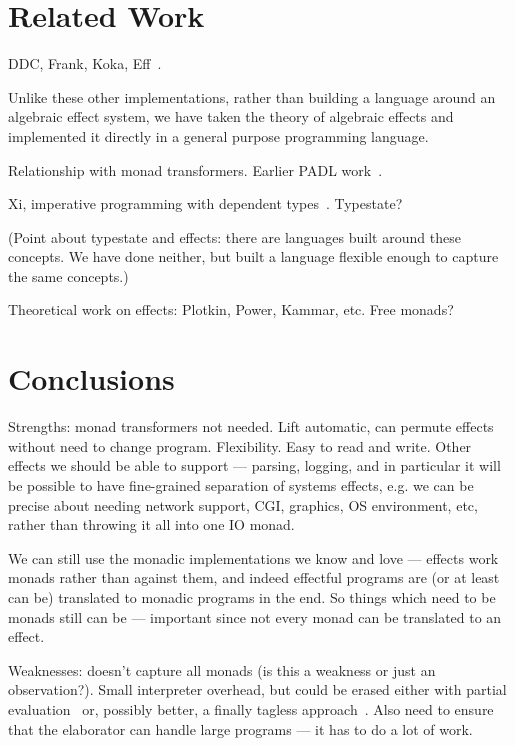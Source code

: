 \section{Related Work}

DDC, Frank, Koka, Eff~\cite{Bauer}.

Unlike these other implementations, rather than building a language around
an algebraic effect system, we have taken the theory of algebraic effects and
implemented it directly in a general purpose programming language.

Relationship with monad transformers.  Earlier PADL work~\cite{bradyresource}.

Xi, imperative programming with dependent types~\cite{Xi2000}.
Typestate?~\cite{Strom1986,Aldrich2009}

(Point about typestate and effects: there are languages built around these
concepts.  We have done neither, but built a language flexible enough to
capture the same concepts.)

Theoretical work on effects: Plotkin, Power, Kammar, etc. Free monads?

\section{Conclusions}

Strengths: monad transformers not needed. Lift automatic, can permute effects
without need to change program. Flexibility. Easy to read and write.
Other effects we should be able to support --- parsing, logging, and in particular
it will be possible to have fine-grained separation of systems effects, e.g.
we can be precise about needing network support, CGI, graphics, OS
environment, etc, rather than throwing it all into one IO monad.

We can still use the monadic implementations we know and love --- effects work
 monads rather than against them, and indeed effectful programs
are (or at least can be) translated to monadic programs in the end. So things
which need to be monads still can be --- important since not every monad
can be translated to an effect.

Weaknesses: doesn't capture all monads (is this a weakness or just an
observation?). Small interpreter overhead, but could be erased either with
partial evaluation~\cite{Brady2010} or, possibly better, a finally
tagless approach~\cite{Carette2009}. Also need to ensure that the elaborator
can handle large programs --- it has to do a lot of work.

